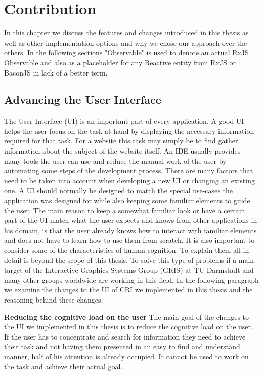 \chapter{Contribution}
In this chapter we discuss the features and changes introduced in this thesis as well as other implementation options and why we chose our approach over the others.
In the following sections "Observable" is used to denote an actual RxJS Observable and also as a placeholder for any Reactive entity from RxJS or BaconJS in lack of a better term.

\section{Advancing the User Interface}
The User Interface (UI) is an important part of every application. A good UI helps the user focus on the task at hand by displaying the necessary information required for that task. For a website this task may simply be to find gather information about the subject of the website itself. An IDE usually provides many tools the user can use and reduce the manual work of the user by automating some steps of the development process. There are many factors that need to be taken into account when developing a new UI or changing an existing one. A UI should normally be designed to match the special use-cases the application was designed for while also keeping some familiar elements to guide the user. The main reason to keep a somewhat familiar look or have a certain part of the UI match what the user expects and knows from other applications in his domain, is that the user already knows how to interact with familiar elements and does not have to learn how to use them from scratch. It is also important to consider some of the characteristics of human cognition. To explain them all in detail is beyond the scope of this thesis. To solve this type of problems if a main target of the Interactive Graphics Systems Group (GRIS) at TU-Darmstadt and many other groups worldwide are working in this field. In the following paragraph we examine the changes to the UI of CRI we implemented in this thesis and the reasoning behind these changes.
  
\textbf{Reducing the cognitive load on the user}
The main goal of the changes to the UI we implemented in this thesis is to reduce the cognitive load on the user. If the user has to concentrate and search for information they need to achieve their task and not having them presented in an easy to find and understand manner, half of his attention is already occupied. It cannot be used to work on the task and achieve their actual goal.

